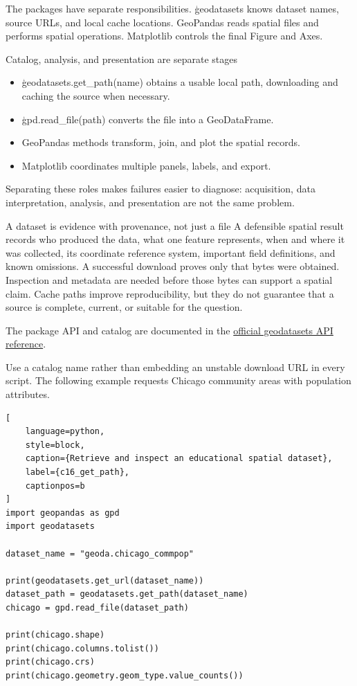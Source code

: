 The packages have separate responsibilities. \c{geodatasets} knows dataset
names, source URLs, and local cache locations. GeoPandas reads spatial files
and performs spatial operations. Matplotlib controls the final Figure and Axes.

\begin{SyntaxBox}{Catalog, analysis, and presentation are separate stages}
\begin{itemize}
    \item \c{geodatasets.get_path(name)} obtains a usable local path, downloading
          and caching the source when necessary.
    \item \c{gpd.read_file(path)} converts the file into a GeoDataFrame.
    \item GeoPandas methods transform, join, and plot the spatial records.
    \item Matplotlib coordinates multiple panels, labels, and export.
\end{itemize}
Separating these roles makes failures easier to diagnose: acquisition, data
interpretation, analysis, and presentation are not the same problem.
\end{SyntaxBox}

\begin{ExplainBox}{A dataset is evidence with provenance, not just a file}
A defensible spatial result records who produced the data, what one feature
represents, when and where it was collected, its coordinate reference system,
important field definitions, and known omissions. A successful download proves
only that bytes were obtained. Inspection and metadata are needed before those
bytes can support a spatial claim. Cache paths improve reproducibility, but
they do not guarantee that a source is complete, current, or suitable for the
question.
\end{ExplainBox}

The package API and catalog are documented in the
\href{https://geodatasets.readthedocs.io/en/latest/api.html}{official geodatasets API reference}.


Use a catalog name rather than embedding an unstable download URL in every
script. The following example requests Chicago community areas with population
attributes.

\begin{lstlisting}[
    language=python,
    style=block,
    caption={Retrieve and inspect an educational spatial dataset},
    label={c16_get_path},
    captionpos=b
]
import geopandas as gpd
import geodatasets

dataset_name = "geoda.chicago_commpop"

print(geodatasets.get_url(dataset_name))
dataset_path = geodatasets.get_path(dataset_name)
chicago = gpd.read_file(dataset_path)

print(chicago.shape)
print(chicago.columns.tolist())
print(chicago.crs)
print(chicago.geometry.geom_type.value_counts())
\end{lstlisting}

